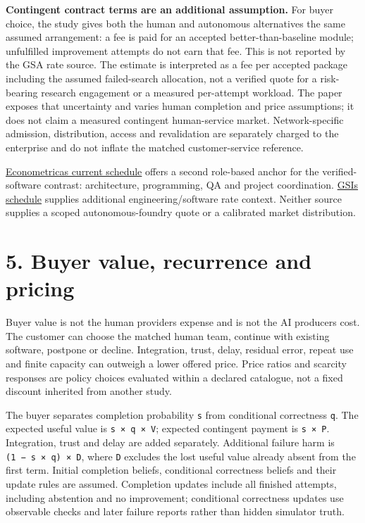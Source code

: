 \documentclass[
  10pt,
]{article}
\let\studysection\section
\renewcommand{\section}{\Needspace{7\baselineskip}\studysection}
\begin{document}
\textbf{Contingent contract terms are an additional assumption.} For
buyer choice, the study gives both the human and autonomous alternatives
the same assumed arrangement: a fee is paid for an accepted
better-than-baseline module; unfulfilled improvement attempts do not
earn that fee. This is not reported by the GSA rate source. The estimate
is interpreted as a fee per accepted package including the assumed
failed-search allocation, not a verified quote for a risk-bearing
research engagement or a measured per-attempt workload. The paper
exposes that uncertainty and varies human completion and price
assumptions; it does not claim a measured contingent human-service
market. Network-specific admission, distribution, access and
revalidation are separately charged to the enterprise and do not inflate
the matched customer-service reference.

\href{https://www.gsaadvantage.gov/ref_text/GS00F101CA/GS00F101CA_TextFilePostBaseline.pdf}{Econometrica\textquotesingle s
current schedule} offers a second role-based anchor for the
verified-software contrast: architecture, programming, QA and project
coordination.
\href{https://www.gsaadvantage.gov/ref_text/47QRAA19D002Z/0ZYICH.3VOV75_47QRAA19D002Z_47QRAA19D002ZGSINACATALOG.PDF}{GSI\textquotesingle s
schedule} supplies additional engineering/software rate context. Neither
source supplies a scoped autonomous-foundry quote or a calibrated market
distribution.

\hypertarget{5-buyer-value-recurrence-and-pricing}{%
\section{5. Buyer value, recurrence and
pricing}\label{5-buyer-value-recurrence-and-pricing}}

Buyer value is not the human provider\textquotesingle s expense and is
not the AI producer\textquotesingle s cost. The customer can choose the
matched human team, continue with existing software, postpone or
decline. Integration, trust, delay, residual error, repeat use and
finite capacity can outweigh a lower offered price. Price ratios and
scarcity responses are policy choices evaluated within a declared
catalogue, not a fixed discount inherited from another study.

The buyer separates completion probability \texttt{s} from conditional
correctness \texttt{q}. The expected useful value is
\texttt{s\ ×\ q\ ×\ V}; expected contingent payment is \texttt{s\ ×\ P}.
Integration, trust and delay are added separately. Additional failure
harm is \texttt{(1\ −\ s\ ×\ q)\ ×\ D}, where \texttt{D} excludes the
lost useful value already absent from the first term. Initial completion
beliefs, conditional correctness beliefs and their update rules are
assumed. Completion updates include all finished attempts, including
abstention and no improvement; conditional correctness updates use
observable checks and later failure reports rather than hidden simulator
truth.
\end{document}
